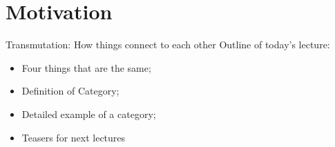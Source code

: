 \section{Motivation}

\begin{frame}{Transmutation: How things connect to each other}
    Outline of today's lecture:
    \begin{itemize}
        \item Four things that are the same;
        \item Definition of Category;
        \item Detailed example of a category;
        \item Teasers for next lectures
    \end{itemize}
\end{frame}

